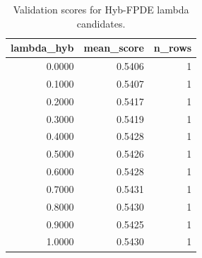 \begin{table}[t]
\caption{Validation scores for Hyb-FPDE lambda candidates.}
\label{tab:lambda_distribution_computed}
\centering
\begin{tabular}{rrr}
\toprule
lambda\_hyb & mean\_score & n\_rows \\
\midrule
0.0000 & 0.5406 & 1 \\
0.1000 & 0.5407 & 1 \\
0.2000 & 0.5417 & 1 \\
0.3000 & 0.5419 & 1 \\
0.4000 & 0.5428 & 1 \\
0.5000 & 0.5426 & 1 \\
0.6000 & 0.5428 & 1 \\
0.7000 & 0.5431 & 1 \\
0.8000 & 0.5430 & 1 \\
0.9000 & 0.5425 & 1 \\
1.0000 & 0.5430 & 1 \\
\bottomrule
\end{tabular}

\end{table}
